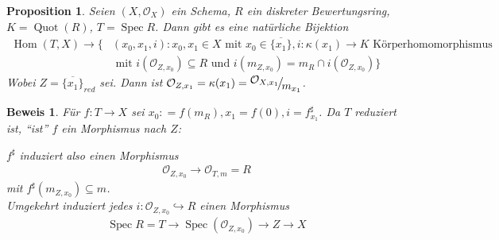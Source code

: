 \documentclass[a4paper,oneside]{scrbook}
\theoremstyle{break}
\newtheorem{Prop}[Def]{Proposition}
\theoremstyle{nonumberbreak}
\theoremstyle{nonumberplain}
\newtheorem{Bew}{Beweis}
\theoremstyle{break}
\newcommand{\defeqr}[0]{\mathrel{\mathop:}=}
\newcommand{\Spec}{%
	\ensuremath{\operatorname{Spec}}%
}
\DeclareMathOperator{\Hom}{Hom}
\DeclareMathOperator{\Quot}{Quot}
\newcommand{\FakRaum}[2]{
  \raisebox{0.7ex}{\ensuremath{#1}}
  \ensuremath{\mkern-3mu}\big/\ensuremath{\mkern-3mu}
  \raisebox{-0.6ex}{\ensuremath{#2}}}
\begin{document}
\begin{Prop}
  \label{prop:7.4}
  Seien $(X,\mathcal O_X)$ ein Schema, $R$ ein diskreter Bewertungsring, $K=\Quot(R)$, $T=\Spec R$. 
  Dann gibt es eine natürliche Bijektion
  \begin{align*}
    \Hom(T,X)\longrightarrow \{ & (x_0,x_1,i):x_0,x_1\in X\text{ mit } x_0\in\overline{\{x_1\}}, i:\kappa(x_1)\to K\text{ Körperhomomorphismus} \\
    & \text{ mit } i(\mathcal O_{Z,x_0})\subseteq R\text{ und } i(m_{Z,x_0})=m_R\cap i(\mathcal O_{Z,x_0})\}
  \end{align*}
  Wobei $Z=\overline{\{x_1\}}_{red}$ sei. Dann ist $\mathcal O_{Z,x_1}=\kappa(x_1)=\FakRaum{\mathcal O_{X,x_1}}{m_{x_1}}$.
\end{Prop}

\begin{Bew}
  Für $f:T\to X$ sei $x_0\defeqr f(m_R), x_1=f(0), i=f_{x_1}^\sharp$. Da $T$ reduziert ist, ``ist'' $f$ ein Morphismus nach $Z$:
  \begin{center}
  \end{center}
  $f^\sharp$ induziert also einen Morphismus
  \begin{align*}
    \mathcal O_{Z,x_0}\longrightarrow\mathcal O_{T,m}=R
  \end{align*}
  mit $f^\sharp(m_{Z,x_0})\subseteq m$. \\
  Umgekehrt induziert jedes $i:\mathcal O_{Z,x_0}\hookrightarrow R$ einen Morphismus
  \begin{align*}
    \Spec R=T\to\Spec(\mathcal O_{Z,x_0})\to Z\to X
  \end{align*}
\end{Bew}
\end{document}
